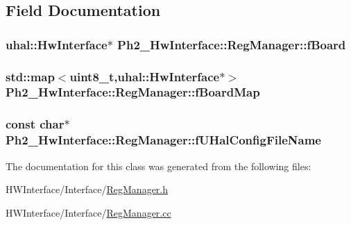 \subsection{Field Documentation}
\hypertarget{class_ph2___hw_interface_1_1_reg_manager_a0d4908ec834a3a0b7d8139872fd0a4a0}{
\subsubsection[{f\-Board}]{\setlength{\rightskip}{0pt plus 5cm}uhal\-::\-Hw\-Interface$\ast$ Ph2\-\_\-\-Hw\-Interface\-::\-Reg\-Manager\-::f\-Board\hspace{0.3cm}{\ttfamily [protected]}}}\label{class_ph2___hw_interface_1_1_reg_manager_a0d4908ec834a3a0b7d8139872fd0a4a0}
\hypertarget{class_ph2___hw_interface_1_1_reg_manager_a9c34ffe467a572796c05036533bb6d39}{
\subsubsection[{f\-Board\-Map}]{\setlength{\rightskip}{0pt plus 5cm}std\-::map$<$uint8\-\_\-t,uhal\-::\-Hw\-Interface$\ast$$>$ Ph2\-\_\-\-Hw\-Interface\-::\-Reg\-Manager\-::f\-Board\-Map\hspace{0.3cm}{\ttfamily [protected]}}}\label{class_ph2___hw_interface_1_1_reg_manager_a9c34ffe467a572796c05036533bb6d39}
\hypertarget{class_ph2___hw_interface_1_1_reg_manager_aaaa29ca65c283acc645132c7bef0f24f}{
\subsubsection[{f\-U\-Hal\-Config\-File\-Name}]{\setlength{\rightskip}{0pt plus 5cm}const char$\ast$ Ph2\-\_\-\-Hw\-Interface\-::\-Reg\-Manager\-::f\-U\-Hal\-Config\-File\-Name\hspace{0.3cm}{\ttfamily [protected]}}}\label{class_ph2___hw_interface_1_1_reg_manager_aaaa29ca65c283acc645132c7bef0f24f}


The documentation for this class was generated from the following files\-:\begin{DoxyCompactItemize}
\item 
H\-W\-Interface/\-Interface/\hyperlink{_reg_manager_8h}{Reg\-Manager.\-h}\item 
H\-W\-Interface/\-Interface/\hyperlink{_reg_manager_8cc}{Reg\-Manager.\-cc}\end{DoxyCompactItemize}
